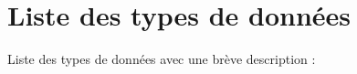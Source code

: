 \section{Liste des types de données}
Liste des types de données avec une brève description \+:\begin{DoxyCompactList}
\item{}
\end{DoxyCompactList}
